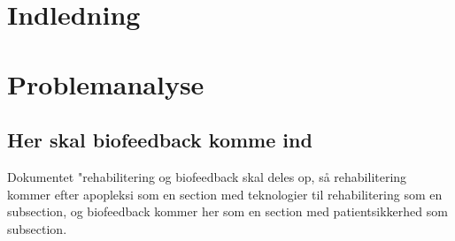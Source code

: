





\frontmatter


\cleardoublepage

 
\cleardoublepage


\tableofcontents*

\mainmatter
\chapter{Indledning}



\chapter{Problemanalyse}







\section{Her skal biofeedback komme ind} 
Dokumentet "rehabilitering og biofeedback skal deles op, så rehabilitering kommer efter apopleksi som en section med teknologier til rehabilitering som en subsection, og biofeedback kommer her som en section med patientsikkerhed som subsection.



\clearpage





